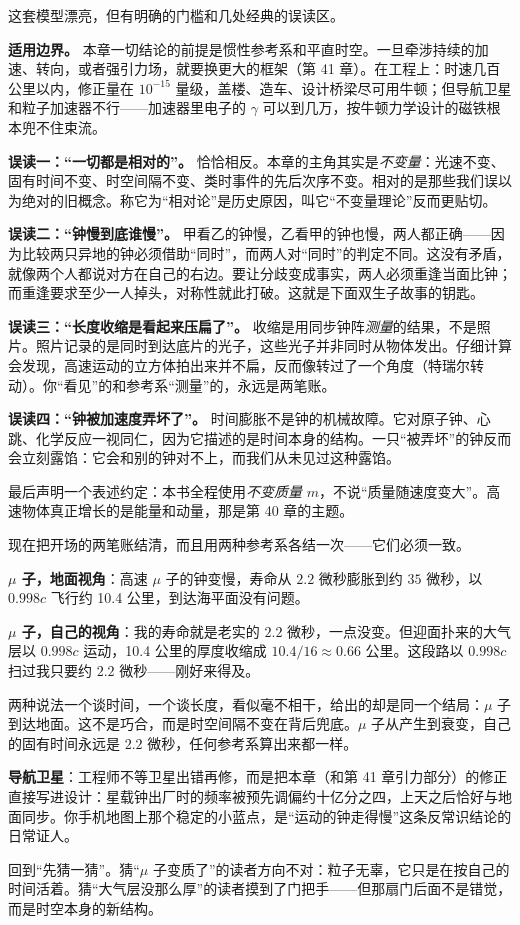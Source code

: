 \begin{mainline}
这套模型漂亮，但有明确的门槛和几处经典的误读区。

\textbf{适用边界。} 本章一切结论的前提是惯性参考系和平直时空。一旦牵涉持续的加速、转向，或者强引力场，就要换更大的框架（第 41 章）。在工程上：时速几百公里以内，修正量在 \(10^{-15}\) 量级，盖楼、造车、设计桥梁尽可用牛顿；但导航卫星和粒子加速器不行——加速器里电子的 \(\gamma\) 可以到几万，按牛顿力学设计的磁铁根本兜不住束流。

\textbf{误读一：“一切都是相对的”。} 恰恰相反。本章的主角其实是\emph{不变量}：光速不变、固有时间不变、时空间隔不变、类时事件的先后次序不变。相对的是那些我们误以为绝对的旧概念。称它为“相对论”是历史原因，叫它“不变量理论”反而更贴切。

\textbf{误读二：“钟慢到底谁慢”。} 甲看乙的钟慢，乙看甲的钟也慢，两人都正确——因为比较两只异地的钟必须借助“同时”，而两人对“同时”的判定不同。这没有矛盾，就像两个人都说对方在自己的右边。要让分歧变成事实，两人必须重逢当面比钟；而重逢要求至少一人掉头，对称性就此打破。这就是下面双生子故事的钥匙。

\textbf{误读三：“长度收缩是看起来压扁了”。} 收缩是用同步钟阵\emph{测量}的结果，不是照片。照片记录的是同时到达底片的光子，这些光子并非同时从物体发出。仔细计算会发现，高速运动的立方体拍出来并不扁，反而像转过了一个角度（特瑞尔转动）。你“看见”的和参考系“测量”的，永远是两笔账。

\textbf{误读四：“钟被加速度弄坏了”。} 时间膨胀不是钟的机械故障。它对原子钟、心跳、化学反应一视同仁，因为它描述的是时间本身的结构。一只“被弄坏”的钟反而会立刻露馅：它会和别的钟对不上，而我们从未见过这种露馅。

最后声明一个表述约定：本书全程使用\emph{不变质量} \(m\)，不说“质量随速度变大”。高速物体真正增长的是能量和动量，那是第 40 章的主题。
\end{mainline}


\begin{mainline}
现在把开场的两笔账结清，而且用两种参考系各结一次——它们必须一致。

\textbf{\(\mu\) 子，地面视角}：高速 \(\mu\) 子的钟变慢，寿命从 \(2.2\) 微秒膨胀到约 \(35\) 微秒，以 \(0.998c\) 飞行约 10.4 公里，到达海平面没有问题。

\textbf{\(\mu\) 子，自己的视角}：我的寿命就是老实的 \(2.2\) 微秒，一点没变。但迎面扑来的大气层以 \(0.998c\) 运动，10.4 公里的厚度收缩成 \(10.4/16\approx 0.66\) 公里。这段路以 \(0.998c\) 扫过我只要约 \(2.2\) 微秒——刚好来得及。

两种说法一个谈时间，一个谈长度，看似毫不相干，给出的却是同一个结局：\(\mu\) 子到达地面。这不是巧合，而是时空间隔不变在背后兜底。\(\mu\) 子从产生到衰变，自己的固有时间永远是 \(2.2\) 微秒，任何参考系算出来都一样。

\textbf{导航卫星}：工程师不等卫星出错再修，而是把本章（和第 41 章引力部分）的修正直接写进设计：星载钟出厂时的频率被预先调偏约十亿分之四，上天之后恰好与地面同步。你手机地图上那个稳定的小蓝点，是“运动的钟走得慢”这条反常识结论的日常证人。

回到“先猜一猜”。猜“\(\mu\) 子变质了”的读者方向不对：粒子无辜，它只是在按自己的时间活着。猜“大气层没那么厚”的读者摸到了门把手——但那扇门后面不是错觉，而是时空本身的新结构。
\end{mainline}

